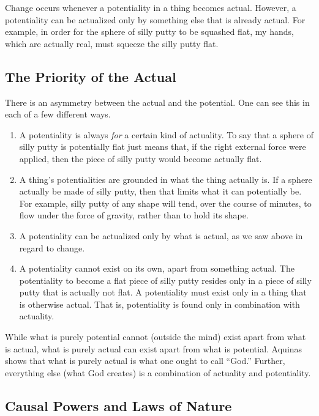 \documentclass[twocolumn]{article}
\begin{document}
Change occurs whenever a potentiality in a thing becomes actual.  However, a
potentiality can be actualized only by something else that is already actual.
For example, in order for the sphere of silly putty to be squashed flat, my
hands, which are actually real, must squeeze the silly putty flat.

\subsection{The Priority of the Actual}

There is an asymmetry between the actual and the potential.  One can see this
in each of a few different ways.
\begin{enumerate}
   \item A potentiality is always \emph{for} a certain kind of actuality.  To
      say that a sphere of silly putty is potentially flat just means that, if
      the right external force were applied, then the piece of silly putty
      would become actually flat.
   \item A thing's potentialities are grounded in what the thing actually is.
      If a sphere actually be made of silly putty, then that limits what it can
      potentially be.  For example, silly putty of any shape will tend, over
      the course of minutes, to flow under the force of gravity, rather than to
      hold its shape.
   \item A potentiality can be actualized only by what is actual, as we saw
      above in regard to change.
   \item A potentiality cannot exist on its own, apart from something actual.
      The potentiality to become a flat piece of silly putty resides only in a
      piece of silly putty that is actually not flat.  A potentiality must
      exist only in a thing that is otherwise actual.  That is, potentiality is
      found only in combination with actuality.
\end{enumerate}
While what is purely potential cannot (outside the mind) exist apart from what
is actual, what is purely actual can exist apart from what is potential.
Aquinas shows that what is purely actual is what one ought to call ``God.''
Further, everything else (what God creates) is a combination of actuality and
potentiality.

\subsection{Causal Powers and Laws of Nature}
\end{document}

